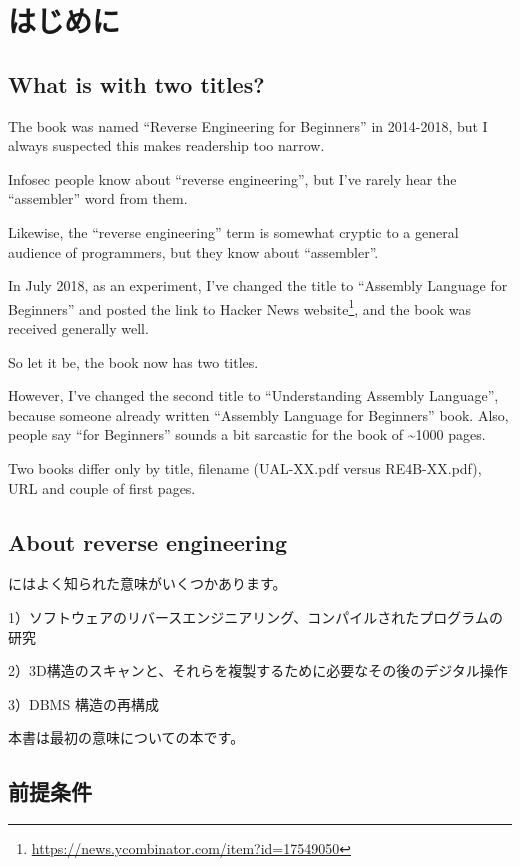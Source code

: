 \section*{はじめに}

\subsection*{What is with two titles?}
\label{TwoTitles}

The book was named ``Reverse Engineering for Beginners'' in 2014-2018, but I always suspected this makes readership too narrow.

Infosec people know about ``reverse engineering'', but I've rarely hear the ``assembler'' word from them.

Likewise, the ``reverse engineering'' term is somewhat cryptic to a general audience of programmers, but they know about ``assembler''.

In July 2018, as an experiment, I've changed the title to ``Assembly Language for Beginners''
and posted the link to Hacker News website\footnote{\url{https://news.ycombinator.com/item?id=17549050}}, and the book was received generally well.

So let it be, the book now has two titles.

However, I've changed the second title to ``Understanding Assembly Language'', because someone already written ``Assembly Language for Beginners'' book.
Also, people say ``for Beginners'' sounds a bit sarcastic for the book of \textasciitilde{}1000 pages.

Two books differ only by title, filename (UAL-XX.pdf versus RE4B-XX.pdf), URL and couple of first pages.

\subsection*{About reverse engineering}

にはよく知られた意味がいくつかあります。

1）ソフトウェアのリバースエンジニアリング、コンパイルされたプログラムの研究

2）3D構造のスキャンと、それらを複製するために必要なその後のデジタル操作

3）\ac{DBMS} 構造の再構成

本書は最初の意味についての本です。

\subsection*{前提条件}

